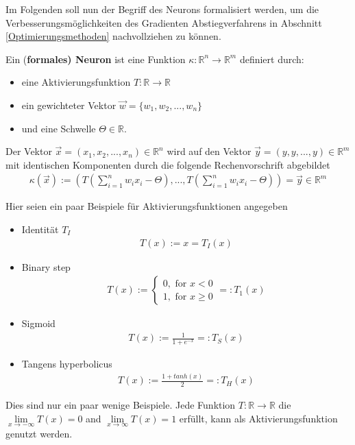 Im Folgenden soll nun der Begriff des Neurons formalisiert 
werden, um die Verbesserungsmöglichkeiten des Gradienten
Abstiegverfahrens in Abschnitt \ref{Optimierungsmethoden} 
nachvollziehen zu können.

\begin{definition} \label{Def:formales Neuron}
\cite[Kapitel 1.2]{BurkhardLenze.1997} Ein (\textbf{formales) Neuron} ist eine Funktion $\kappa: \mathbb{R}^n \rightarrow \mathbb{R}^m$ definiert durch:
\begin{itemize}
\item eine Aktivierungsfunktion $T:\mathbb{R} \rightarrow \mathbb{R}$
\item ein gewichteter Vektor $\vec{w} = \{w_1,w_2,...,w_n\}$
\item und eine Schwelle  $\Theta\in\mathbb{R}$.
\end{itemize}
Der Vektor $\vec{x} = (x_1,x_2,...,x_n)\in \mathbb{R}^n$ wird auf den Vektor $\vec{y} = (y,y,...,y)\in \mathbb{R}^m$ mit identischen Komponenten durch die folgende Rechenvorschrift abgebildet
\begin{align}
\kappa(\vec{x}):= (T(\sum\limits_{i=1}^n w_i x_i - \Theta),...,T(\sum\limits_{i=1}^n w_i x_i - \Theta))=\vec{y} \in \mathbb{R}^m
\end{align}   
\end{definition}
Hier seien ein paar Beispiele für Aktivierungsfunktionen angegeben
\begin{itemize}
\item Identität $T_I$
\begin{align*}
T(x):=x=T_I(x)
\end{align*}
\item Binary step
\begin{align*}
T(x) := \begin{cases} 0, \text{ for } x < 0 \\ 1, \text{ for } x \geq 0 \end{cases} =: T_1 (x)
\end{align*}
\item Sigmoid
\begin{align*}
T(x) := \frac{1}{1+e^{-x}} =: T_S(x)
\end{align*}
\item Tangens hyperbolicus
\begin{align*}
T(x) := \frac{1+tanh(x)}{2} =: T_H(x)
\end{align*}
\end{itemize}
Dies sind nur ein paar wenige Beispiele.
Jede Funktion $T:\mathbb{R}\rightarrow \mathbb{R}$
die $\lim\limits_{x \rightarrow -\infty}{T(x)}=0$ 
and $\lim\limits_{x \rightarrow \infty}{T(x)}=1$ erfüllt,
kann als Aktivierungsfunktion genutzt werden.

